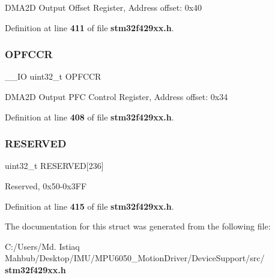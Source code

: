 D\+M\+A2D Output Offset Register, Address offset\+: 0x40 

Definition at line \textbf{ 411} of file \textbf{ stm32f429xx.\+h}.

\mbox{\label{structDMA2D__TypeDef_a79db32535165c766c9de2374a27ed059}} 
\subsubsection{O\+P\+F\+C\+CR}
{\footnotesize\ttfamily \+\_\+\+\_\+\+IO uint32\+\_\+t O\+P\+F\+C\+CR}

D\+M\+A2D Output P\+FC Control Register, Address offset\+: 0x34 

Definition at line \textbf{ 408} of file \textbf{ stm32f429xx.\+h}.

\mbox{\label{structDMA2D__TypeDef_aba866c9137d0c578b9344d88cfbe17f2}} 
\subsubsection{R\+E\+S\+E\+R\+V\+ED}
{\footnotesize\ttfamily uint32\+\_\+t R\+E\+S\+E\+R\+V\+ED[236]}

Reserved, 0x50-\/0x3\+FF 

Definition at line \textbf{ 415} of file \textbf{ stm32f429xx.\+h}.



The documentation for this struct was generated from the following file\+:\begin{DoxyCompactItemize}
\item 
C\+:/\+Users/\+Md. Istiaq Mahbub/\+Desktop/\+I\+M\+U/\+M\+P\+U6050\+\_\+\+Motion\+Driver/\+Device\+Support/src/\textbf{ stm32f429xx.\+h}\end{DoxyCompactItemize}
